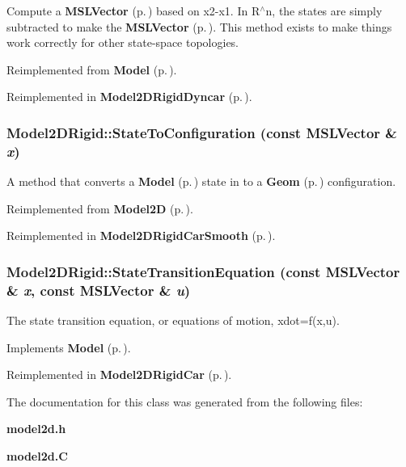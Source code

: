 Compute a {\bf MSLVector} {\rm (p.\,\pageref{classMSLVector})} based on x2-x1. In R$^\wedge$n, the states are simply subtracted to make the {\bf MSLVector} {\rm (p.\,\pageref{classMSLVector})}. This method exists to make things work correctly for other state-space topologies.



Reimplemented from {\bf Model} {\rm (p.\,\pageref{classModel_a7})}.

Reimplemented in {\bf Model2DRigid\-Dyncar} {\rm (p.\,\pageref{classModel2DRigidDyncar_a7})}.
\subsubsection{ Model2DRigid::State\-To\-Configuration (const {\bf MSLVector} \& {\em x})\hspace{0.3cm}{\tt  [virtual]}}\label{classModel2DRigid_a7}


A method that converts a {\bf Model} {\rm (p.\,\pageref{classModel})} state in to a {\bf Geom} {\rm (p.\,\pageref{classGeom})} configuration.



Reimplemented from {\bf Model2D} {\rm (p.\,\pageref{classModel2D_a2})}.

Reimplemented in {\bf Model2DRigid\-Car\-Smooth} {\rm (p.\,\pageref{classModel2DRigidCarSmooth_a4})}.
\subsubsection{ Model2DRigid::State\-Transition\-Equation (const {\bf MSLVector} \& {\em x}, const {\bf MSLVector} \& {\em u})\hspace{0.3cm}{\tt  [virtual]}}\label{classModel2DRigid_a3}


The state transition equation, or equations of motion, xdot=f(x,u).



Implements {\bf Model} {\rm (p.\,\pageref{classModel_a3})}.

Reimplemented in {\bf Model2DRigid\-Car} {\rm (p.\,\pageref{classModel2DRigidCar_a2})}.

The documentation for this class was generated from the following files:\begin{CompactItemize}
\item 
{\bf model2d.h}\item 
{\bf model2d.C}\end{CompactItemize}

